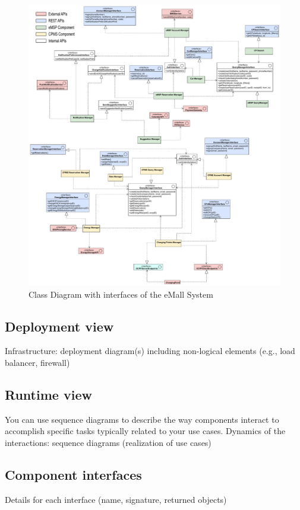\begin{figure}[H]
    \centering
    \hspace*{-2.5cm}
    \includegraphics[height=\textheight-1.5cm,keepaspectratio]{src/componentInterfaces/component_interface.pdf}
    \caption{Class Diagram with interfaces of the eMall System}
\end{figure}

\subsection{Deployment view}
Infrastructure: deployment diagram(s) including non-logical elements (e.g., load balancer, firewall)

\subsection{Runtime view}
You can use sequence diagrams to describe the way components interact to accomplish specific tasks typically related to your use cases. Dynamics of the interactions: sequence
diagrams (realization of use cases)

\subsection{Component interfaces}
Details for each interface (name, signature, returned objects)
